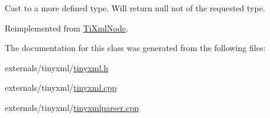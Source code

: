 Cast to a more defined type. Will return null not of the requested type. 



Reimplemented from \hyperlink{class_ti_xml_node_aa65d000223187d22a4dcebd7479e9ebc}{Ti\-Xml\-Node}.



The documentation for this class was generated from the following files\-:\begin{DoxyCompactItemize}
\item 
externals/tinyxml/\hyperlink{tinyxml_8h}{tinyxml.\-h}\item 
externals/tinyxml/\hyperlink{tinyxml_8cpp}{tinyxml.\-cpp}\item 
externals/tinyxml/\hyperlink{tinyxmlparser_8cpp}{tinyxmlparser.\-cpp}\end{DoxyCompactItemize}
